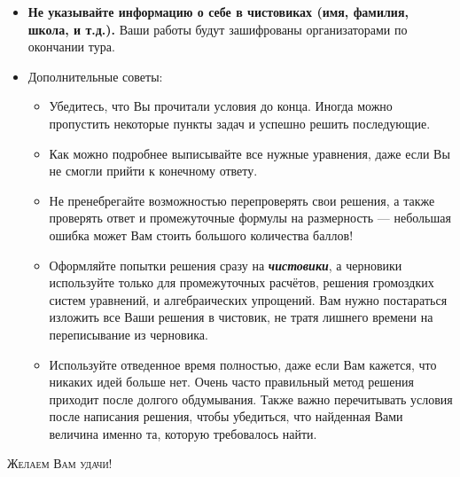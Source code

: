 \begin{itemize}[leftmargin=*]
    \item \textbf{Не указывайте информацию о себе в чистовиках (имя, фамилия, школа, и т.д.).} Ваши работы будут зашифрованы организаторами по окончании тура.
    \item Дополнительные советы:
    \begin{itemize}[label=$\circ$]
        \item Убедитесь, что Вы прочитали условия до конца. Иногда можно пропустить некоторые пункты задач и успешно решить последующие.
        \item Как можно подробнее выписывайте все нужные уравнения, даже если Вы не смогли прийти к конечному ответу.
        \item Не пренебрегайте возможностью перепроверять свои решения, а также проверять ответ и промежуточные формулы на размерность --- небольшая ошибка может Вам стоить большого количества баллов!
        \item Оформляйте попытки решения сразу на \textbf{\textit{чистовики}}, а черновики используйте только для промежуточных расчётов, решения громоздких систем уравнений, и алгебраических упрощений. Вам нужно постараться изложить все Ваши решения в чистовик, не тратя лишнего времени на переписывание из черновика.
        \item Используйте отведенное время полностью, даже если Вам кажется, что никаких идей больше нет. Очень часто правильный метод решения приходит после долгого обдумывания. Также важно перечитывать условия после написания решения, чтобы убедиться, что найденная Вами величина именно та, которую требовалось найти.
    \end{itemize}
\end{itemize}
%
\vspace{4pt}%
%
\begin{center}
    \textsc{Желаем Вам удачи!}
\end{center}%
%
\begin{center}
    \textit{}
\end{center}

\newpage